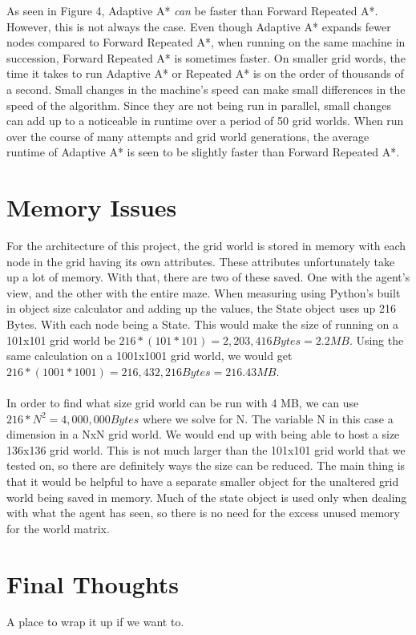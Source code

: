 \documentclass[titlepage]{article}
\begin{document}
    As seen in Figure 4, Adaptive A* \emph{can} be faster than Forward Repeated A*. However, this is not always the case. Even though Adaptive A* expands fewer nodes compared to Forward Repeated A*, when running on the same machine in succession, Forward Repeated A* is sometimes faster. On smaller grid words, the time it takes to run Adaptive A* or Repeated A* is on the order of thousands of a second. Small changes in the machine's speed can make small differences in the speed of the algorithm. Since they are not being run in parallel, small changes can add up to a noticeable in runtime over a period of 50 grid worlds. When run over the course of many attempts and grid world generations, the average runtime of Adaptive A* is seen to be slightly faster than Forward Repeated A*.
    
\section{Memory Issues}
For the architecture of this project, the grid world is stored in memory with each node in the grid having its own attributes. These attributes unfortunately take up a lot of memory. With that, there are two of these saved. One with the agent's view, and the other with the entire maze. When measuring using Python's built in object size calculator and adding up the values, the State object uses up 216 Bytes. With each node being a State. This would make the size of running on a 101x101 grid world be $216*(101*101) = 2,203,416 Bytes = 2.2MB$. Using the same calculation on a 1001x1001 grid world, we would get $216*(1001*1001) = 216,432,216 Bytes = 216.43 MB$.\\
\\
In order to find what size grid world can be run with 4 MB, we can use $216*N^2 = 4,000,000 Bytes$ where we solve for N. The variable N in this case a dimension in a NxN grid world. We would end up with being able to host a size 136x136 grid world. This is not much larger than the 101x101 grid world that we tested on, so there are definitely ways the size can be reduced. The main thing is that it would be helpful to have a separate smaller object for the unaltered grid world being saved in memory. Much of the state object is used only when dealing with what the agent has seen, so there is no need for the excess unused memory for the world matrix.

\section*{Final Thoughts}
A place to wrap it up if we want to.
\end{document}
